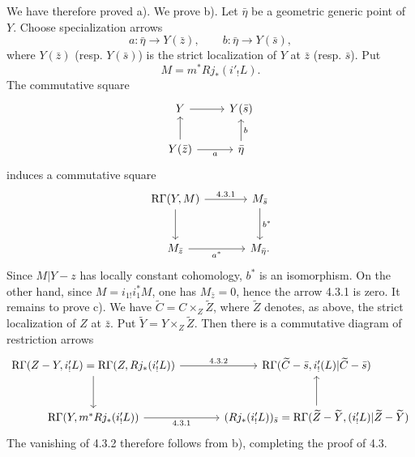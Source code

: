 \documentclass[11pt]{article}
\begin{document}
We have therefore proved a). We prove b). Let $\bar\eta$ be a geometric generic point of $Y$. Choose specialization arrows
\[
a:\bar\eta\to Y(\bar z),\qquad b:\bar\eta\to Y(\bar s),
\]
where $Y(\bar z)$ (resp. $Y(\bar s)$) is the strict localization of $Y$ at $\bar z$ (resp. $\bar s$). Put
\[
M=m^*Rj_*(i'_!L).
\]
The commutative square
\[
\begin{tikzcd}
Y \arrow[r] & Y(\bar s)\\
Y(\bar z) \arrow[u] \arrow[r,"a"'] & \bar\eta \arrow[u,"b"']
\end{tikzcd}
\]
induces a commutative square
\[
\begin{tikzcd}[column sep=large,row sep=large]
\mathrm R\Gamma(Y,M) \arrow[r,"4.3.1"] \arrow[d] & M_{\bar s} \arrow[d,"b^*"]\\
M_{\bar z} \arrow[r,"a^*"'] & M_{\bar\eta}.
\end{tikzcd}
\]
Since $M|Y-z$ has locally constant cohomology, $b^*$ is an isomorphism. On the other hand, since $M=i_{1!}i_1^*M$, one has $M_{\bar z}=0$, hence the arrow 4.3.1 is zero. It remains to prove c). We have $\widetilde C=C\times_Z\widetilde Z$, where $\widetilde Z$ denotes, as above, the strict localization of $Z$ at $\bar z$. Put $\widetilde Y=Y\times_Z\widetilde Z$. Then there is a commutative diagram of restriction arrows
\[
\begin{tikzcd}[column sep=large,row sep=large]
\mathrm R\Gamma(Z-Y,i'_!L)=\mathrm R\Gamma(Z,Rj_*(i'_!L))
 \arrow[r,"4.3.2"] \arrow[d]
&
\mathrm R\Gamma(\widetilde C-\bar s,i'_!(L)|\widetilde C-\bar s)\\
\mathrm R\Gamma(Y,m^*Rj_*(i'_!L)) \arrow[r,"4.3.1"']
&
(Rj_*(i'_!L))_{\bar s}
  =\mathrm R\Gamma(\widetilde Z-\widetilde Y,(i'_!L)|\widetilde Z-\widetilde Y) \arrow[u]
\end{tikzcd}
\]
The vanishing of 4.3.2 therefore follows from b), completing the proof of 4.3.
\end{document}
